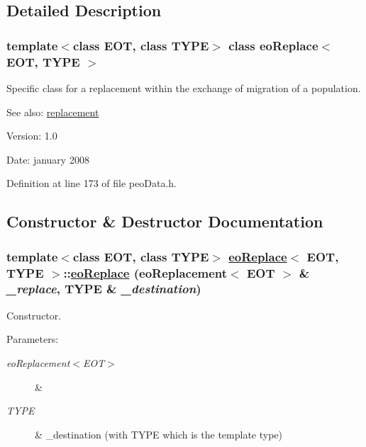 \subsection{Detailed Description}
\subsubsection*{template$<$class EOT, class TYPE$>$ class eo\-Replace$<$ EOT, TYPE $>$}

Specific class for a replacement within the exchange of migration of a population. 

\begin{Desc}
\item[See also:]\hyperlink{classreplacement}{replacement} \end{Desc}
\begin{Desc}
\item[Version:]1.0 \end{Desc}
\begin{Desc}
\item[Date:]january 2008 \end{Desc}




Definition at line 173 of file peo\-Data.h.

\subsection{Constructor \& Destructor Documentation}
\hypertarget{classeoReplace_816081d8c7e8342d254402c5185efcbb}{
\subsubsection[eoReplace]{\setlength{\rightskip}{0pt plus 5cm}template$<$class EOT, class TYPE$>$ \hyperlink{classeoReplace}{eo\-Replace}$<$ EOT, TYPE $>$::\hyperlink{classeoReplace}{eo\-Replace} (\bf{eo\-Replacement}$<$ EOT $>$ \& {\em \_\-replace}, TYPE \& {\em \_\-destination})}}
\label{classeoReplace_816081d8c7e8342d254402c5185efcbb}


Constructor. 

\begin{Desc}
\item[Parameters:]
\begin{description}
\item[{\em eo\-Replacement$<$EOT$>$}]\& \item[{\em TYPE}]\& \_\-destination (with TYPE which is the template type) \end{description}
\end{Desc}


